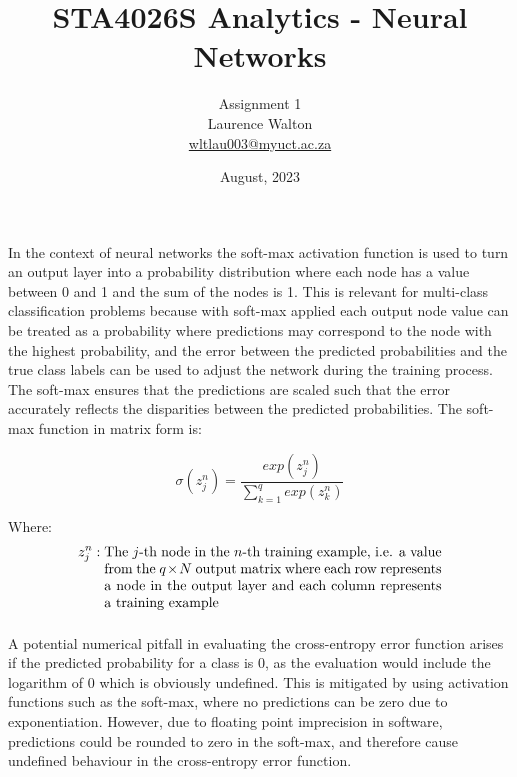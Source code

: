 \documentclass[12pt]{article}
\begin{document}
\title{STA4026S Analytics - Neural Networks}

\author{Assignment 1\\
        Laurence Walton\\
        \href{mailto:wltlau003@myuct.ac.za}{wltlau003@myuct.ac.za}
}
\date{August, 2023}

\maketitle

\subsubsection{}
In the context of neural networks the soft-max activation function is used to turn an output layer into a probability distribution where each node has a value between 0 and 1 and the sum of the nodes is 1. This is relevant for multi-class classification problems because with soft-max applied each output node value can be treated as a probability where predictions may correspond to the node with the highest probability, and the error between the predicted probabilities and the true class labels can be used to adjust the network during the training process. The soft-max ensures that the predictions are scaled such that the error accurately reflects the disparities between the predicted probabilities.
The soft-max function in matrix form is:

\[
\sigma(z^n_j) = \frac{exp(z^n_j)}{\sum_{k=1}^q exp(z^n_k)}
\]

Where:
\begin{align*}
z^n_j & : \parbox[t]{0.7\textwidth}{The $j$-th node in the $n$-th training example, i.e. a value from the $q \times N$ output matrix where each row represents a node in the output layer and each column represents a training example} \\
\end{align*}

\subsubsection{}
A potential numerical pitfall in evaluating the cross-entropy error function arises if the predicted probability for a class is 0, as the evaluation would include the logarithm of 0 which is obviously undefined. This is mitigated by using activation functions such as the soft-max, where no predictions can be zero due to exponentiation. However, due to floating point imprecision in software, predictions could be rounded to zero in the soft-max, and therefore cause undefined behaviour in the cross-entropy error function.
\end{document}
